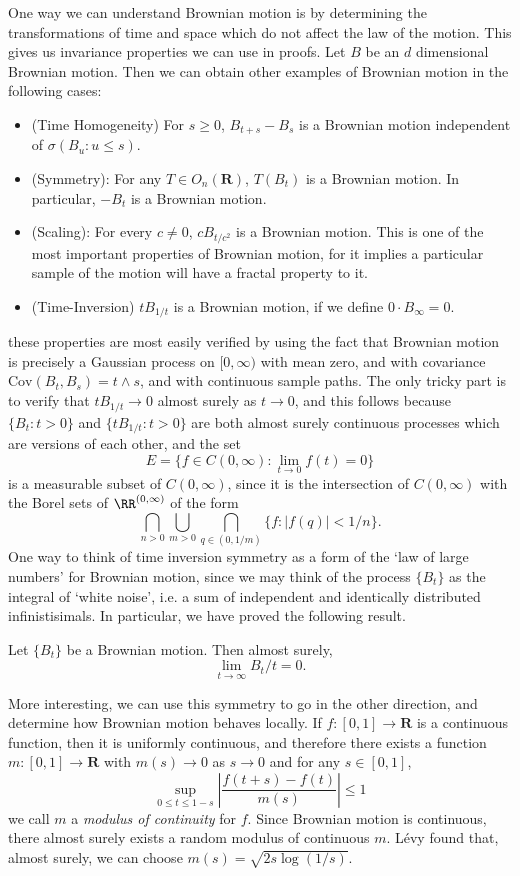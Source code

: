 One way we can understand Brownian motion is by determining the transformations of time and space which do not affect the law of the motion. This gives us invariance properties we can use in proofs. Let $B$ be an $d$ dimensional Brownian motion. Then we can obtain other examples of Brownian motion in the following cases:
%
\begin{itemize}
    \item (Time Homogeneity) For $s \geq 0$, $B_{t+s} - B_s$ is a Brownian motion independent of $\sigma(B_u: u \leq s)$.
    \item (Symmetry): For any $T \in O_n(\mathbf{R})$, $T(B_t)$ is a Brownian motion. In particular, $-B_t$ is a Brownian motion.
    \item (Scaling): For every $c \neq 0$, $cB_{t/c^2}$ is a Brownian motion. This is one of the most important properties of Brownian motion, for it implies a particular sample of the motion will have a fractal property to it.
    \item (Time-Inversion) $tB_{1/t}$ is a Brownian motion, if we define $0 \cdot B_\infty = 0$.
\end{itemize}
%
these properties are most easily verified by using the fact that Brownian motion is precisely a Gaussian process on $[0,\infty)$ with mean zero, and with covariance $\text{Cov}(B_t, B_s) = t \wedge s$, and with continuous sample paths. The only tricky part is to verify that $tB_{1/t} \to 0$ almost surely as $t \to 0$, and this follows because $\{ B_t : t > 0 \}$ and $\{ t B_{1/t} : t > 0 \}$ are both almost surely continuous processes which are versions of each other, and the set
%
\[ E = \{ f \in C(0,\infty): \lim_{t \to 0} f(t) = 0 \} \]
%
is a measurable subset of $C(0,\infty)$, since it is the intersection of $C(0,\infty)$ with the Borel sets of $\RR^{(0,\infty)}$ of the form
%
\[ \bigcap_{n > 0} \bigcup_{m > 0} \bigcap_{q \in (0,1/m)} \{ f : |f(q)| < 1/n \}. \]
%
One way to think of time inversion symmetry as a form of the `law of large numbers' for Brownian motion, since we may think of the process $\{ B_t \}$ as the integral of `white noise', i.e. a sum of independent and identically distributed infinistisimals. In particular, we have proved the following result.

\begin{theorem}
    Let $\{ B_t \}$ be a Brownian motion. Then almost surely,
    \[ \lim_{t \to \infty} B_t / t = 0. \]
\end{theorem}

More interesting, we can use this symmetry to go in the other direction, and determine how Brownian motion behaves locally. If $f: [0,1] \to \mathbf{R}$ is a continuous function, then it is uniformly continuous, and therefore there exists a function $m: [0,1] \to \mathbf{R}$ with $m(s) \to 0$ as $s \to 0$ and for any $s \in [0,1]$,
%
\[ \sup_{0 \leq t \leq 1-s} \left| \frac{f(t + s) - f(t)}{m(s)}\right| \leq 1 \]
%
we call $m$ a \emph{modulus of continuity} for $f$. Since Brownian motion is continuous, there almost surely exists a random modulus of continuous $m$. L\'{e}vy found that, almost surely, we can choose $m(s) = \sqrt{2s \log(1/s)}$.

